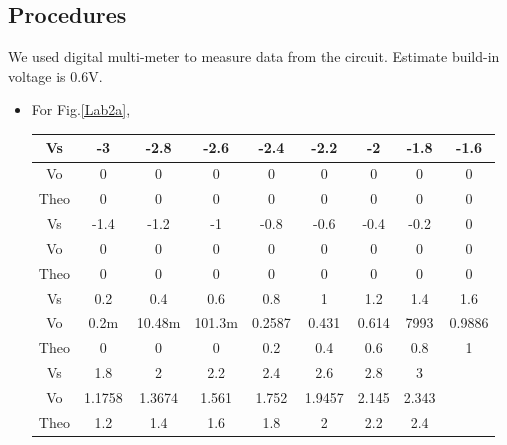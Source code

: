     \subsection{Procedures}
    We used digital multi-meter to measure data from the circuit. Estimate build-in voltage is 0.6V.
    \begin{itemize}
        \item For Fig.\ref{Lab2a},\par
            \begin{table}[h]
            \centering
            \begin{tabular}{|c|c|c|c|c|c|c|c|c|}
                \hline
                Vs   & -3     & -2.8   & -2.6   & -2.4   & -2.2   & -2    & -1.8  & -1.6   \\ \hline
                Vo   & 0      & 0      & 0      & 0      & 0      & 0     & 0     & 0      \\ \hline
                Theo & 0      & 0      & 0      & 0      & 0      & 0     & 0     & 0      \\ \hline
                Vs   & -1.4   & -1.2   & -1     & -0.8   & -0.6   & -0.4  & -0.2  & 0      \\ \hline
                Vo   & 0      & 0      & 0      & 0      & 0      & 0     & 0     & 0      \\ \hline
                Theo & 0      & 0      & 0      & 0      & 0      & 0     & 0     & 0      \\ \hline
                Vs   & 0.2    & 0.4    & 0.6    & 0.8    & 1      & 1.2   & 1.4   & 1.6    \\ \hline
                Vo   & 0.2m   & 10.48m & 101.3m & 0.2587 & 0.431  & 0.614 & 7993  & 0.9886 \\ \hline
                Theo & 0      & 0      & 0      & 0.2    & 0.4    & 0.6   & 0.8   & 1      \\ \hline
                Vs   & 1.8    & 2      & 2.2    & 2.4    & 2.6    & 2.8   & 3     &        \\ \hline
                Vo   & 1.1758 & 1.3674 & 1.561  & 1.752  & 1.9457 & 2.145 & 2.343 &        \\ \hline
                Theo & 1.2    & 1.4    & 1.6    & 1.8    & 2      & 2.2   & 2.4   &        \\ \hline
            \end{tabular}
            \end{table}
            \FloatBarrier
            \begin{figure}[h]
                \centering

\end{figure}
\end{itemize}
